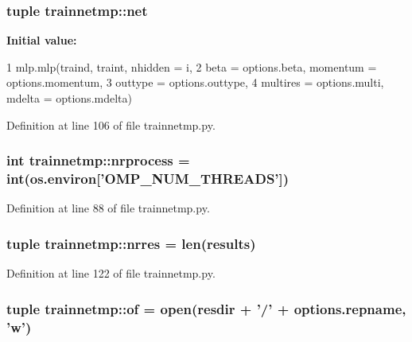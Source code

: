 \hypertarget{namespacetrainnetmp_abc8273df12ede80d1022efecac2e6883}{
\subsubsection[{net}]{\setlength{\rightskip}{0pt plus 5cm}tuple {\bf trainnetmp::net}}}
\label{namespacetrainnetmp_abc8273df12ede80d1022efecac2e6883}
{\bfseries Initial value:}
\begin{DoxyCode}
1 mlp.mlp(traind, traint, nhidden = i,
2                           beta = options.beta, momentum = options.momentum, 
3                           outtype = options.outtype, 
4                           multires = options.multi, mdelta = options.mdelta)
\end{DoxyCode}


Definition at line 106 of file trainnetmp.py.

\hypertarget{namespacetrainnetmp_a0ce23022a012fafdc81c769f9ea2ae84}{
\subsubsection[{nrprocess}]{\setlength{\rightskip}{0pt plus 5cm}int {\bf trainnetmp::nrprocess} = int(os.environ\mbox{[}'OMP\_\-NUM\_\-THREADS'\mbox{]})}}
\label{namespacetrainnetmp_a0ce23022a012fafdc81c769f9ea2ae84}


Definition at line 88 of file trainnetmp.py.

\hypertarget{namespacetrainnetmp_aeaf295e503c8c7a7eb9d4e5a77ed5499}{
\subsubsection[{nrres}]{\setlength{\rightskip}{0pt plus 5cm}tuple {\bf trainnetmp::nrres} = len({\bf results})}}
\label{namespacetrainnetmp_aeaf295e503c8c7a7eb9d4e5a77ed5499}


Definition at line 122 of file trainnetmp.py.

\hypertarget{namespacetrainnetmp_a5348e04a55d2a7563398585f1b851efa}{
\subsubsection[{of}]{\setlength{\rightskip}{0pt plus 5cm}tuple {\bf trainnetmp::of} = open({\bf resdir} + '/' + options.repname, 'w')}}
\label{namespacetrainnetmp_a5348e04a55d2a7563398585f1b851efa}


